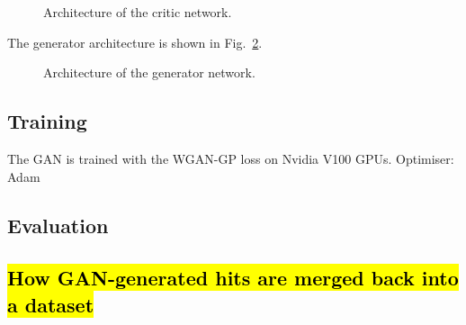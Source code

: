 \begin{figure}
    \centering
    \caption{Architecture of the critic network.}
    \label{fig:disc_arch}
\end{figure}

The generator architecture is shown in Fig.~\ref{fig:gen_arch}.

\begin{figure}
    \centering
    \caption{Architecture of the generator network.}
    \label{fig:gen_arch}
\end{figure}

\subsection{Training}

The GAN is trained with the WGAN-GP loss on Nvidia V100 GPUs.
Optimiser: Adam

\subsection{Evaluation}






\subsection{\hl{How GAN-generated hits are merged back into a dataset}}



